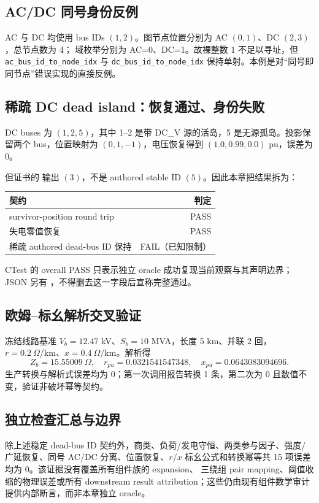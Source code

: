 \subsection{AC/DC 同号身份反例}

AC 与 DC 均使用 bus IDs $(1,2)$。图节点位置分别为 AC $(0,1)$、DC $(2,3)$，总节点数为 4；
域枚举分别为 AC=0、DC=1。故裸整数 1 不足以寻址，但
\texttt{ac\_bus\_id\_to\_node\_idx} 与
\texttt{dc\_bus\_id\_to\_node\_idx} 保持单射。本例是对“同号即同节点”错误实现的直接反例。

\subsection{稀疏 DC dead island：恢复通过、身份失败}

DC buses 为 $(1,2,5)$，其中 1--2 是带 DC\_V 源的活岛，5 是无源孤岛。投影保留两个 bus，位置映射为
$(0,1,-1)$，电压恢复得到 $(1.0,0.99,0.0)$ pu，误差为 0。

但证书的  输出 $(3)$，不是 authored stable ID $(5)$。因此本章把结果拆为：
\begin{center}\small
\begin{tabular}{@{}lr@{}}\toprule
契约 & 判定\\\midrule
survivor-position round trip & PASS\\
失电零值恢复 & PASS\\
稀疏 authored dead-bus ID 保持 & FAIL（已知限制）\\\bottomrule
\end{tabular}
\end{center}
CTest 的 overall PASS 只表示独立 oracle 成功复现当前观察与其声明边界；JSON 另有
，不得删去这一字段后宣称完整通过。

\subsection{欧姆--标幺解析交叉验证}

冻结线路基准 $V_b=12.47$ kV、$S_b=10$ MVA，长度 5 km、并联 2 回，
$r=0.2\ \Omega/\mathrm{km}$、$x=0.4\ \Omega/\mathrm{km}$。解析得
\begin{equation}
 Z_b=15.55009\ \Omega,\quad r_{pu}=0.0321541547348,\quad
 x_{pu}=0.0643083094696.
\end{equation}
生产转换与解析式误差均为 0；第一次调用报告转换 1 条，第二次为 0 且数值不变，验证非破坏幂等契约。

\subsection{独立检查汇总与边界}

除上述稳定 dead-bus ID 契约外，商类、负荷/发电守恒、两类参与因子、强度/广延恢复、同号 AC/DC
分离、位置恢复、$r/x$ 标幺公式和转换幂等共 15 项误差均为 0。该证据没有覆盖所有组件族的 expansion、
三绕组 pair mapping、阈值收缩的物理误差或所有 downstream result attribution；这些仍由现有组件数学审计
提供内部断言，而非本章独立 oracle。

